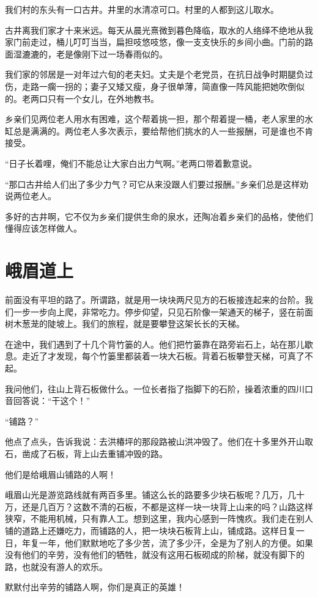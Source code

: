 \documentclass[12pt,UTF-8,openany]{ctexbook}
\begin{document}
\begin{large}
    
    我们村的东头有一口古井。井里的水清凉可口。村里的人都到这儿取水。
    
    古井离我们家才十来米远。每天从晨光熹微到暮色降临，取水的人络绎不绝地从我家门前走过，桶儿叮叮当当，扁担吱悠吱悠，像一支支快乐的乡间小曲。门前的路面湿漉漉的，老是像刚下过一场春雨似的。
    
    我们家的邻居是一对年过六旬的老夫妇。丈夫是个老党员，在抗日战争时期腿负过伤，走路一瘸一拐的；妻子又矮又瘦，身子很单薄，简直像一阵风能把她吹倒似的。老两口只有一个女儿，在外地教书。
    
    乡亲们见两位老人用水有困难，这个帮着挑一担，那个帮着提一桶，老人家里的水缸总是满满的。两位老人多次表示，要给帮他们挑水的人一些报酬，可是谁也不肯接受。
    
    “日子长着哩，俺们不能总让大家白出力气啊。”老两口带着歉意说。
    
    “那口古井给人们出了多少力气？可它从来没跟人们要过报酬。”乡亲们总是这样劝说两位老人。
    
    多好的古井啊，它不仅为乡亲们提供生命的泉水，还陶冶着乡亲们的品格，使他们懂得应该怎样做人。
    
\end{large}



\chapter{峨眉道上}

\begin{large}
    
    前面没有平坦的路了。所谓路，就是用一块块两尺见方的石板接连起来的台阶。我们一步一步向上爬，非常吃力。停步仰望，只见石阶像一架通天的梯子，竖在前面树木葱茏的陡坡上。我们的旅程，就是要攀登这架长长的天梯。
    
    在途中，我们遇到了十几个背竹篓的人。他们把竹篓靠在路旁岩石上，站在那儿歇息。走近了才发现，每个竹篓里都装着一块大石板。背着石板攀登天梯，可真了不起。
    
    我问他们，往山上背石板做什么。一位长者指了指脚下的石阶，操着浓重的四川口音回答说：“干这个！”
    
    “铺路？”
    
    他点了点头，告诉我说：去洪椿坪的那段路被山洪冲毁了。他们在十多里外开山取石，凿成了石板，背上山去重铺冲毁的路。
    
    他们是给峨眉山铺路的人啊！
    
    峨眉山光是游览路线就有两百多里。铺这么长的路要多少块石板呢？几万，几十万，还是几百万？这数不清的石板，不都是这样一块一块背上山来的吗？山路这样狭窄，不能用机械，只有靠人工。想到这里，我内心感到一阵愧疚。我们走在别人铺的道路上还嫌吃力，而铺路的人，把一块块石板背上山，铺成路。这样日复一日，年复一年，他们默默地吃了多少苦，流了多少汗，全是为了别人的方便。如果没有他们的辛劳，没有他们的牺牲，就没有这用石板砌成的阶梯，就没有脚下的路，也就没有游人的欢乐。
    
    默默付出辛劳的铺路人啊，你们是真正的英雄！
    
\end{large}
\end{document}
